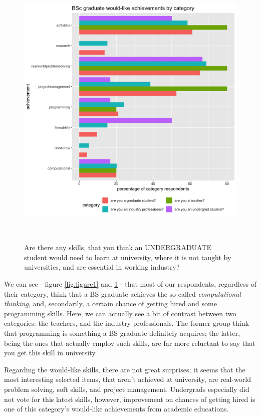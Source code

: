 \documentclass{sigchi}
\begin{document}
\begin{figure}[h]
 \includegraphics[scale=0.2]{../data-analysis/plots_output/BSc_graduate_would-like_achievements_by_category.png}
  \caption{Are there any skills, that you think an UNDERGRADUATE student would need to learn at university, where it is not taught by universities, and are essential in working industry?}~\label{fig:figure2}
\end{figure}

We can see - figure \ref{fig:figure1} and \ref{fig:figure2} - that most of our respondents, regardless of their category, think that a BS graduate achieves the so-called \textit{computational thinking}, and, secondarily, a certain chance of getting hired and some programming skills. Here, we can actually see a bit of contrast between two categories: the teachers, and the industry professionals. The former group think that programming is something a BS graduate definitely acquires; the latter, being the ones that actually employ such skills, are far more reluctant to say that you get this skill in university.

Regarding the would-like skills, there are not great surprises; it seems that the most interesting selected items, that aren't achieved at university, are real-world problem solving, soft skills, and project management. Undergrads especially did not vote for this latest skills, however, improvement on chances of getting hired is one of this category's would-like achievements from academic educations.
\end{document}
